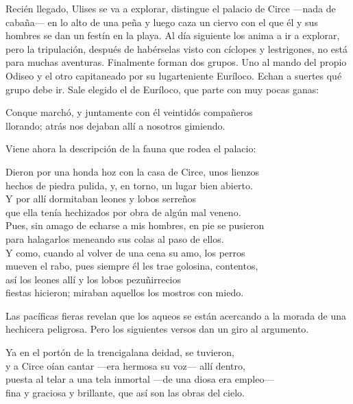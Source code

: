 Recién llegado, Ulises se va a explorar, distingue el palacio de Circe ---nada de cabaña--- en lo alto de una peña y luego caza un ciervo con el que él y sus hombres se dan un festín en la playa. Al día siguiente los anima a ir a explorar, pero la tripulación, después de habérselas visto con cíclopes y lestrigones, no está para muchas aventuras. Finalmente forman dos grupos. Uno al mando del propio Odiseo y el otro capitaneado por su lugarteniente Euríloco. Echan a suertes qué grupo debe ir. Sale elegido el de Euríloco, que parte con muy pocas ganas:

\begin{versocita}
Conque marchó, y juntamente con él veintidós compañeros\\
llorando; atrás nos dejaban allí a nosotros gimiendo.
\end{versocita}

Viene ahora la descripción de la fauna que rodea el palacio:

\begin{versocita}
Dieron por una honda hoz con la casa de Circe, unos lienzos\\
hechos de piedra pulida, y, en torno, un lugar bien abierto.\\
Y por allí dormitaban leones y lobos serreños\\
que ella tenía hechizados por obra de algún mal veneno.\\
Pues, sin amago de echarse a mis hombres, en pie se pusieron\\
para halagarlos meneando sus colas al paso de ellos.\\
Y como, cuando al volver de una cena su amo, los perros\\
mueven el rabo, pues siempre él les trae golosina, contentos,\\
así los leones allí y los lobos pezuñirrecios\\
fiestas hicieron; miraban aquellos los mostros con miedo.
\end{versocita}

Las pacíficas fieras revelan que los aqueos se están acercando a la morada de una hechicera peligrosa. Pero los siguientes versos dan un giro al argumento.

\begin{versocita}
Ya en el portón de la trencigalana deidad, se tuvieron,\\
y a Circe oían cantar ---era hermosa su voz--- allí dentro,\\
puesta al telar a una tela inmortal ---de una diosa era empleo---\\
fina y graciosa y brillante, que así son las obras del cielo.
\end{versocita}

